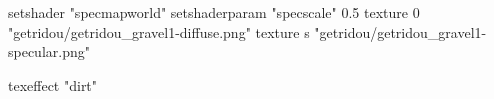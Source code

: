 setshader "specmapworld"
setshaderparam "specscale" 0.5
texture 0 "getridou/getridou_gravel1-diffuse.png"
texture s "getridou/getridou_gravel1-specular.png"

texeffect "dirt"


